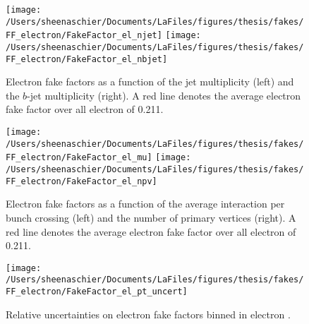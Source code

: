 \begin{figure}[tbp]
  \centering
  \texttt{[image: /Users/sheenaschier/Documents/LaFiles/figures/thesis/fakes/FF\_electron/FakeFactor\_el\_njet]}
  \texttt{[image: /Users/sheenaschier/Documents/LaFiles/figures/thesis/fakes/FF\_electron/FakeFactor\_el\_nbjet]}\\
  \caption{Electron fake factors as a function of the jet multiplicity (left) and the $b$-jet multiplicity (right). A red line denotes the average electron fake factor over all electron \pt{} of 0.211.}
  \label{fig:elec_FF_njet}
\end{figure}


\begin{figure}[tbp]
  \centering
  \texttt{[image: /Users/sheenaschier/Documents/LaFiles/figures/thesis/fakes/FF\_electron/FakeFactor\_el\_mu]}
  \texttt{[image: /Users/sheenaschier/Documents/LaFiles/figures/thesis/fakes/FF\_electron/FakeFactor\_el\_npv]}\\
  \caption{Electron fake factors as a function of the average interaction per bunch crossing (left) and the number of primary vertices (right). A red line denotes the average electron fake factor over all electron \pt{} of 0.211.}
  \label{fig:elec_FF_pileup}
\end{figure}
\fi
\begin{figure}[tbp]
  \centering
  \texttt{[image: /Users/sheenaschier/Documents/LaFiles/figures/thesis/fakes/FF\_electron/FakeFactor\_el\_pt\_uncert]}\\
  \caption{Relative uncertainties on electron fake factors binned in electron \pt{}.}
  \label{fig:elec_FF_rel_uncert}
\end{figure}
 \FloatBarrier
 
 
 
